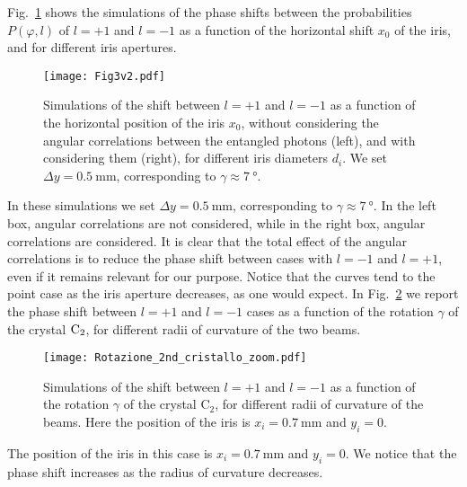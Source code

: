 \documentclass[
reprint,
amsmath,amssymb,
aps,
showkeys
]{revtex4-2}
\begin{document}
Fig.~\ref{fig:phshift} shows the simulations of the phase shifts between the probabilities $P\left(\varphi,l\right)$ of $l=+1$ and $l=-1$ as a function of the horizontal shift $x_0$ of the iris, and for different iris apertures.
%
\begin{figure}
\texttt{[image: Fig3v2.pdf]}
\caption{Simulations of the shift between $l=+1$ and $l=-1$ as a function of the horizontal position of the iris $x_0$, without considering the angular correlations between the entangled photons (left), and with considering them (right), for different iris diameters $d_i$.
We set $\Delta y = \SI{0.5}{\milli\meter}$, corresponding to $\gamma \approx \SI{7}{\degree}$.}
\label{fig:phshift}
\end{figure}
%
In these simulations we set $\Delta y = \SI{0.5}{\milli\meter}$, corresponding to $\gamma \approx \SI{7}{\degree}$.
In the left box, angular correlations are not considered, while in the right box, angular correlations are considered.
It is clear that the total effect of the angular correlations is to reduce the phase shift between cases with $l=-1$ and $l=+1$, even if it remains relevant for our purpose.
Notice that the curves tend to the point case as the iris aperture decreases, as one would expect.
In Fig.~\ref{fig:phshift2} we report the phase shift between $l=+1$ and $l=-1$ cases as a function of the rotation $\gamma$ of the crystal ${\rm C}_2$, for different radii of curvature of the two beams.
%
\begin{figure}
\texttt{[image: Rotazione\_2nd\_cristallo\_zoom.pdf]}
\caption{Simulations of the shift between $l=+1$ and $l=-1$ as a function of the rotation $\gamma$ of the crystal $\mathrm{C}_2$, for different radii of curvature of the beams.
Here the position of the iris is $x_i = \SI{0.7}{\milli\meter}$ and $y_i = 0$.}
\label{fig:phshift2}
\end{figure}
%
The position of the iris in this case is $x_i = \SI{0.7}{\milli\meter}$ and $y_i = 0$.
We notice that the phase shift increases as the radius of curvature decreases.
\end{document}
